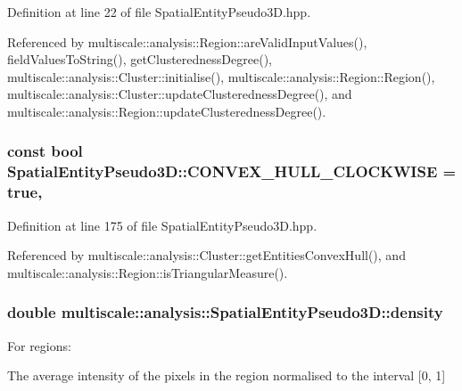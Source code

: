 Definition at line 22 of file Spatial\-Entity\-Pseudo3\-D.\-hpp.



Referenced by multiscale\-::analysis\-::\-Region\-::are\-Valid\-Input\-Values(), field\-Values\-To\-String(), get\-Clusteredness\-Degree(), multiscale\-::analysis\-::\-Cluster\-::initialise(), multiscale\-::analysis\-::\-Region\-::\-Region(), multiscale\-::analysis\-::\-Cluster\-::update\-Clusteredness\-Degree(), and multiscale\-::analysis\-::\-Region\-::update\-Clusteredness\-Degree().

\hypertarget{classmultiscale_1_1analysis_1_1SpatialEntityPseudo3D_ad92f43d2b14c77def3f7a70b54810dd2}{
\subsubsection[{C\-O\-N\-V\-E\-X\-\_\-\-H\-U\-L\-L\-\_\-\-C\-L\-O\-C\-K\-W\-I\-S\-E}]{\setlength{\rightskip}{0pt plus 5cm}const bool Spatial\-Entity\-Pseudo3\-D\-::\-C\-O\-N\-V\-E\-X\-\_\-\-H\-U\-L\-L\-\_\-\-C\-L\-O\-C\-K\-W\-I\-S\-E = true\hspace{0.3cm}{\ttfamily [static]}, {\ttfamily [protected]}}}\label{classmultiscale_1_1analysis_1_1SpatialEntityPseudo3D_ad92f43d2b14c77def3f7a70b54810dd2}


Definition at line 175 of file Spatial\-Entity\-Pseudo3\-D.\-hpp.



Referenced by multiscale\-::analysis\-::\-Cluster\-::get\-Entities\-Convex\-Hull(), and multiscale\-::analysis\-::\-Region\-::is\-Triangular\-Measure().

\hypertarget{classmultiscale_1_1analysis_1_1SpatialEntityPseudo3D_aedf807816f8c2f7cd961acfe0042fc56}{
\subsubsection[{density}]{\setlength{\rightskip}{0pt plus 5cm}double multiscale\-::analysis\-::\-Spatial\-Entity\-Pseudo3\-D\-::density\hspace{0.3cm}{\ttfamily [protected]}}}\label{classmultiscale_1_1analysis_1_1SpatialEntityPseudo3D_aedf807816f8c2f7cd961acfe0042fc56}
\begin{DoxyVerb}                 For regions:
\end{DoxyVerb}
 The average intensity of the pixels in the region normalised to the interval \mbox{[}0, 1\mbox{]}

